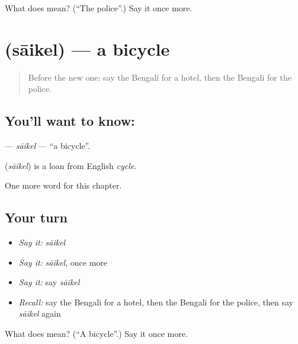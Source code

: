 \begin{tcolorbox}[breakable,colback=teal!4,colframe=teal!35!black,title={Before you move on}]
What does  mean? (\textquotedblleft{}The police\textquotedblright{}.) Say it once more.
\end{tcolorbox}
\section[\texorpdfstring{\bn{সাইকেল} (sāikel)}{সাইকেল (sāikel)}]{ (sāikel) — a bicycle}

\label{lesson:BN-C84-saikel}



\begin{quote}
Before the new one: say the Bengali for a hotel, then the Bengali for the police.
\end{quote}

\subsection*{You'll want to know: }
\textbf{} — \emph{sāikel} — \textquotedblleft{}a bicycle\textquotedblright{}.

\begin{cousinweb}
\textbf{} (\emph{sāikel}) is a loan from English \emph{cycle}.
\end{cousinweb}

\begin{grammarlens}[title={What you've built}]
One more word for this chapter.
\end{grammarlens}

\subsection*{Your turn}
\begin{itemize}
\raggedright
  \item \emph{Say it:} \emph{sāikel}
  \item \emph{Say it:} \emph{sāikel}, once more
  \item \emph{Say it:} say \emph{sāikel}
  \item \emph{Recall:} say the Bengali for a hotel, then the Bengali for the police, then say \emph{sāikel} again
\end{itemize}

\begin{tcolorbox}[breakable,colback=teal!4,colframe=teal!35!black,title={Before you move on}]
What does  mean? (\textquotedblleft{}A bicycle\textquotedblright{}.) Say it once more.
\end{tcolorbox}
